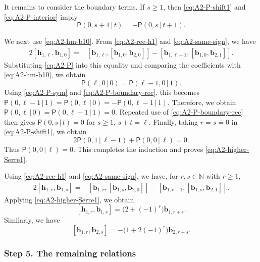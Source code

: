 \documentclass[11pt,reqno]{amsart}
\numberwithin{equation}{section}
\theoremstyle{definition}
\theoremstyle{remark}
\newcommand{\bN}{\mathbb{N}}
\newcommand{\bb}{\mathbf{b}}
\newcommand{\bh}{\mathbf{h}}
\newcommand{\gge}{\geqslant}
\begin{document}
It remains to consider the boundary terms.  If $s\gge1$, then
\eqref{eq:A2-P-shift1} and
\eqref{eq:A2-P-interior} imply
\begin{equation}\label{eq:A2-P-boundary-rec}
\mathsf P(0,s+1\,|\,t)
=
-\mathsf P(0,s\,|\,t+1).
\end{equation}

We next use \eqref{eq:A2-hm-b10}.  From
\eqref{eq:A2-rec-h1} and \eqref{eq:A2-same-sign}, we have
\begin{align*}
2[\bh_{1,\ell},\bb_{1,0}]
={}&
[\bb_{1,\ell},[\bb_{1,0},\bb_{2,0}]]
-
[\bb_{1,\ell-1},[\bb_{1,0},\bb_{2,1}]].
\end{align*}
Substituting \eqref{eq:A2-P} into this equality and comparing the
coefficients with \eqref{eq:A2-hm-b10}, we obtain
\begin{equation*}
\mathsf P(\ell,0\,|\,0)
=
\mathsf P(\ell-1,0\,|\,1).
\end{equation*}
Using \eqref{eq:A2-P-sym} and \eqref{eq:A2-P-boundary-rec}, this becomes
$\mathsf P(0,\ell-1\,|\,1)
=\mathsf P(0,\ell\,|\,0)=-\mathsf P(0,\ell-1\,|\,1)
$. Therefore, we obtain $\mathsf P(0,\ell\,|\,0)
=
\mathsf P(0,\ell-1\,|\,1)
=
0$.
Repeated use of \eqref{eq:A2-P-boundary-rec} then gives
$\mathsf P(0,s\,|\,t)=0$ for
$s\gge1$, $s+t=\ell$.
Finally, taking $r=s=0$ in
\eqref{eq:A2-P-shift1}, we obtain
\begin{equation*}
2\mathsf P(0,1\,|\,\ell-1)
+
\mathsf P(0,0\,|\,\ell)
=
0.
\end{equation*}
Thus $\mathsf P(0,0\,|\,\ell)=0$.  This completes the induction and proves
\eqref{eq:A2-higher-Serre1}.

Using \eqref{eq:A2-rec-h1} and
\eqref{eq:A2-same-sign}, we have, for $r,s\in\bN$ with $r\gge1$,
\begin{align*}
2[\bh_{1,r},\bb_{1,s}]
={}&
[\bb_{1,r},[\bb_{1,s},\bb_{2,0}]]
-
[\bb_{1,r-1},[\bb_{1,s},\bb_{2,1}]].
\end{align*}
Applying \eqref{eq:A2-higher-Serre1}, we obtain
\begin{equation}\label{eq:A2-full-hb11}
[\bh_{1,r},\bb_{1,s}]
=
\bigl(2+(-1)^r\bigr)\bb_{1,r+s}.
\end{equation}
Similarly, we have
\begin{equation}\label{eq:A2-full-hb12}
[\bh_{1,r},\bb_{2,s}]
=
-\bigl(1+2(-1)^r\bigr)\bb_{2,r+s}.
\end{equation}

\subsubsection*{Step 5. The remaining relations}
\end{document}
